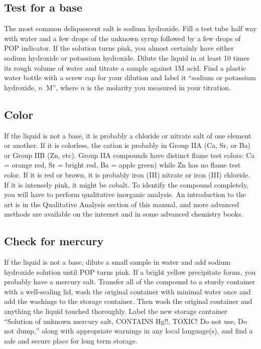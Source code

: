\subsection{Test for a base}
The most common deliquescent salt is sodium hydroxide. 
Fill a test tube half way with water 
and a few drops of the unknown syrup 
followed by a few drops of POP indicator. 
If the solution turns pink, 
you almost certainly have either 
sodium hydroxide or potassium hydroxide. 
Dilute the liquid in at least 10 times its 
rough volume of water and titrate a sample against 1M acid. 
Find a plastic water bottle with a screw cap for your dilution and 
label it ``sodium or potassium hydroxide, 
$n$~M'', 
where $n$ is the molarity you measured in your titration.

\subsection{Color}
If the liquid is not a base, 
it is probably a chloride or nitrate salt of one element or another. 
If it is colorless, 
the cation is probably in Group IIA (Ca, 
Sr, 
or Ba) or Group IIB (Zn, 
etc). 
Group IIA compounds have distinct flame test colors: Ca = orange red, 
Sr = bright red, 
Ba = apple green) while Zn has no flame test color. 
If it is red or brown, 
it is probably iron (III) nitrate or iron (III) chloride. 
If it is intensely pink, 
it might be cobalt. 
To identify the compound completely, 
you will have to perform qualitative inorganic analysis. 
An introduction to the art is 
in the Qualitative Analysis section of this manual, 
and more advanced methods are available on the internet 
and in some advanced chemistry books.

\subsection{Check for mercury}
If the liquid is not a base, 
dilute a small sample in water 
and add sodium hydroxide solution until POP turns pink. 
If a bright yellow precipitate forms, 
you probably have a mercury salt. 
Transfer all of the compound to a sturdy container 
with a well-sealing lid, 
wash the original container with minimal water once 
and add the washings to the storage container. 
Then wash the original container 
and anything the liquid touched thoroughly. 
Label the new storage container ``Solution of unknown mercury salt, 
CONTAINS Hg!!, 
TOXIC! Do not use, 
Do not dump,'' along with appropriate warnings in any local language(s), 
and find a safe and secure place for long term storage.

